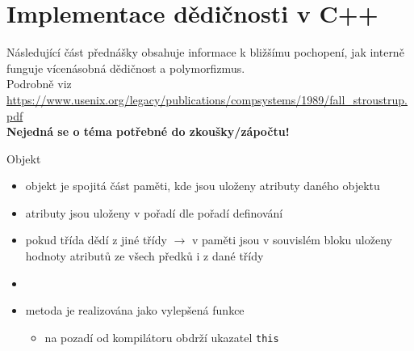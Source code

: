 \nezkouskove
\section{Implementace dědičnosti v C++}

\begin{frame}[fragile]
\vskip 3cm
\vskip 1.5cm
\begin{center}
{\small Následující část přednášky obsahuje informace k bližšímu pochopení, jak interně funguje vícenásobná dědičnost a polymorfizmus. \\ Podrobně viz \url{ https://www.usenix.org/legacy/publications/compsystems/1989/fall_stroustrup.pdf}} \\ \textbf{Nejedná se o téma potřebné do zkoušky/zápočtu!}
\end{center}

\end{frame}


\begin{frame}[fragile]
\begin{bonusblock}{Objekt}
\begin{itemize}
\item objekt je spojitá část paměti, kde jsou uloženy atributy daného objektu
\item atributy jsou uloženy v pořadí dle pořadí definování
\item pokud třída dědí z jiné třídy $\rightarrow$ v paměti jsou v souvislém bloku uloženy hodnoty atributů ze všech předků i z dané třídy
\item[]
\item metoda je realizována jako vylepšená funkce
\begin{itemize}
\item na pozadí od kompilátoru obdrží ukazatel \lstinline|this|
\end{itemize}

\end{itemize}

\end{bonusblock}
\end{frame}

\begin{frame}[fragile]
\end{frame}



